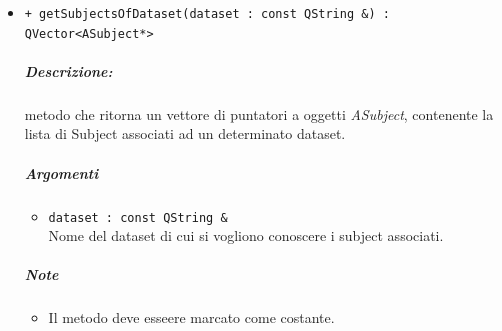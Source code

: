 \begin{itemize}
	\item \color{blue}\verb!+ getSubjectsOfDataset(dataset : const QString &) : QVector<ASubject*>!\\
	\color{black}
	\subparagraph{Descrizione:} metodo che ritorna un vettore di puntatori a oggetti \textsl{ASubject}, contenente la lista di Subject\g{} associati ad un determinato dataset\g{}.
	\subparagraph{Argomenti}
		\begin{itemize}
			\item \color{RoyalPurple}\verb!dataset : const QString &!\\
			\color{black}Nome del dataset\g{} di cui si vogliono conoscere i subject\g{} associati.
		\end{itemize}
	\subparagraph{Note}
			\begin{itemize}
				\item Il metodo deve esseere marcato come costante.
			\end{itemize}

\end{itemize}









